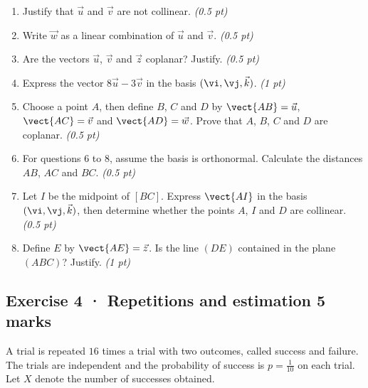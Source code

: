 \begin{enumerate}

\item Justify that $\vec u$ and $\vec v$ are not collinear. \hfill\textit{(0.5 pt)}

\item Write $\vec w$ as a linear combination of $\vec u$ and $\vec v$. \hfill\textit{(0.5 pt)}

\item Are the vectors $\vec u$, $\vec v$ and $\vec z$ coplanar? Justify. \hfill\textit{(0.5 pt)}

\item Express the vector $8\vec u-3\vec v$ in the basis $(\vi,\vj,\vec k)$. \hfill\textit{(1 pt)}

\item Choose a point $A$, then define $B$, $C$ and $D$ by $\vect{AB}=\vec u$, $\vect{AC}=\vec v$ and $\vect{AD}=\vec w$. Prove that $A$, $B$, $C$ and $D$ are coplanar. \hfill\textit{(0.5 pt)}

\item For questions 6 to 8, assume the basis is orthonormal. Calculate the distances $AB$, $AC$ and $BC$. \hfill\textit{(0.5 pt)}

\item Let $I$ be the midpoint of $[BC]$. Express $\vect{AI}$ in the basis $(\vi,\vj,\vec k)$, then determine whether the points $A$, $I$ and $D$ are collinear. \hfill\textit{(0.5 pt)}

\item Define $E$ by $\vect{AE}=\vec z$. Is the line $(DE)$ contained in the plane $(ABC)$? Justify. \hfill\textit{(1 pt)}

\end{enumerate}

\subsection*{Exercise 4 · Repetitions and estimation \hfill 5 marks}A trial is repeated $16$ times a trial with two outcomes, called success and failure. The trials are independent and the probability of success is $p=\frac{1}{10}$ on each trial. Let $X$ denote the number of successes obtained.

